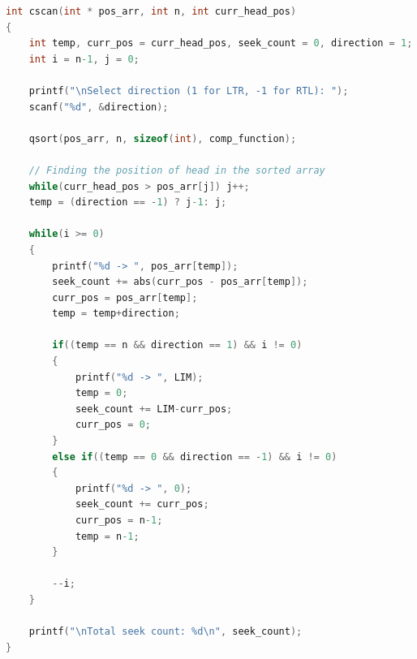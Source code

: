 \documentclass[13pt,oneside]{book}
\begin{document}
\begin{lstlisting}[language=C]
int cscan(int * pos_arr, int n, int curr_head_pos)
{
	int temp, curr_pos = curr_head_pos, seek_count = 0, direction = 1;
	int i = n-1, j = 0;

	printf("\nSelect direction (1 for LTR, -1 for RTL): ");
	scanf("%d", &direction);

	qsort(pos_arr, n, sizeof(int), comp_function);
	
	// Finding the position of head in the sorted array
	while(curr_head_pos > pos_arr[j]) j++;
	temp = (direction == -1) ? j-1: j;

	while(i >= 0)
	{
		printf("%d -> ", pos_arr[temp]);
		seek_count += abs(curr_pos - pos_arr[temp]);
		curr_pos = pos_arr[temp];
		temp = temp+direction;

		if((temp == n && direction == 1) && i != 0)
		{
			printf("%d -> ", LIM);
			temp = 0;
			seek_count += LIM-curr_pos;
			curr_pos = 0;
		}
		else if((temp == 0 && direction == -1) && i != 0)
		{
			printf("%d -> ", 0);
			seek_count += curr_pos;
			curr_pos = n-1;
			temp = n-1;
		}

		--i;
	}

	printf("\nTotal seek count: %d\n", seek_count);
}
    \end{lstlisting}
\end{document}
